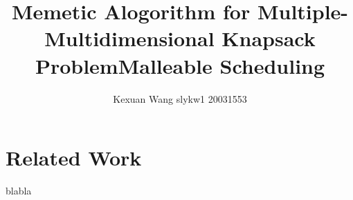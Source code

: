 \documentclass{article}
\author{Kexuan Wang slykw1 20031553}
\date{}
\title{Memetic Alogorithm for Multiple-Multidimensional Knapsack Problem}
\author{}
\date{}
\title{Malleable Scheduling}
\begin{document}
    \maketitle
    \section{Related Work}

    blabla
	
\end{document}
